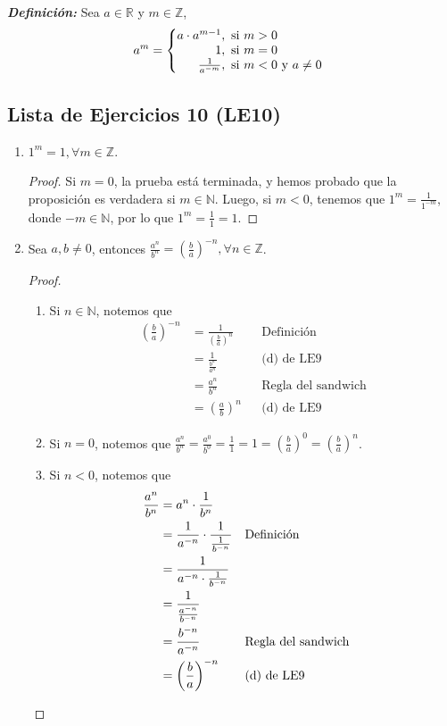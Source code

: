 \documentclass[11pt]{article}
\newcommand{\N}{\mathbb{N}}
\newcommand{\Z}{\mathbb{Z}}
\newcommand{\R}{\mathbb{R}}
\newcommand{\bfit}[1]{\textbf{\textit{#1}}}
\begin{document}

   \bfit{Definición:}  Sea $a\in \R$ y $m\in \Z$,
 \[
  a^m = \left\{
 \begin{array}{@{}r@{\thinspace}l}
  a\cdot a^{m-1}, &  \ \text{si}  \ m > 0\\
  1, &  \ \text{si}  \ m = 0\\
  \frac{1}{a^{-m}}, &  \ \text{si}  \ m < 0 \ \text{y} \ a\neq 0
 \end{array} \right. \]

 \subsection*{Lista de Ejercicios 10 (LE10)}

 \begin{enumerate}[label=\alph*)]
  \item $1^m = 1, \forall m\in \Z$. \begin{proof}
    Si $m=0$, la prueba está terminada, y hemos probado que la proposición es verdadera si $m\in \N$. Luego, si $m<0$, tenemos que $1^m = \frac{1}{1^{-m}}$, donde $-m\in \N$, por lo que $1^m = \frac{1}{1} = 1$.
  \end{proof}

  \item Sea $a,b\neq 0$, entonces $\frac{a^n}{b^n} = \left(\frac{b}{a}\right)^{-n}, \forall n\in \Z$.
  \begin{proof}\leavevmode
    \begin{enumerate}[label=\roman*)]
      \item Si $n\in \N$, notemos que \begin{align*}
        \left(\frac{b}{a}\right)^{-n} &= \frac{1}{\left(\frac{b}{a}\right)^n} && \text{Definición}\\
        &= \frac{1}{\frac{b^n}{a^n}} && \text{(d) de LE9}\\
        &= \frac{a^n}{b^n} && \text{Regla del sandwich}\\
        &= \left(\frac{a}{b}\right)^n && \text{(d) de LE9}
      \end{align*}
      \item Si $n=0$, notemos que $\frac{a^n}{b^n} = \frac{a^0}{b^0} = \frac{1}{1} = 1 = \left(\frac{b}{a}\right)^0 = \left(\frac{b}{a}\right)^n$.
      \item Si $n<0$, notemos que \begin{align*}
        \frac{a^n}{b^n} &= a^n \cdot \frac{1}{b^n}\\
        &= \frac{1}{a^{-n}} \cdot \frac{1}{\frac{1}{b^{-n}}} && \text{Definición}\\
        &= \frac{1}{a^{-n}\cdot \frac{1}{b^{-n}}}\\
        &= \frac{1}{\frac{a^{-n}}{b^{-n}}}\\
        &= \frac{b^{-n}}{a^{-n}} && \text{Regla del sandwich}\\
        &= \left(\frac{b}{a}\right)^{-n} && \text{(d) de LE9} \qedhere
      \end{align*}
    \end{enumerate}
  \end{proof}


\end{enumerate}
\end{document}
